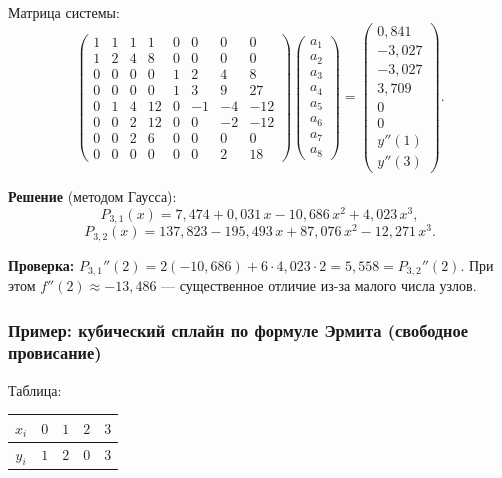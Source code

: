 Матрица системы:
\[
    \begin{pmatrix}
        1 & 1 & 1 & 1 & 0 & 0 & 0 & 0 \\
        1 & 2 & 4 & 8 & 0 & 0 & 0 & 0 \\
        0 & 0 & 0 & 0 & 1 & 2 & 4 & 8 \\
        0 & 0 & 0 & 0 & 1 & 3 & 9 & 27 \\
        0 & 1 & 4 & 12 & 0 & -1 & -4 & -12 \\
        0 & 0 & 2 & 12 & 0 & 0 & -2 & -12 \\
        0 & 0 & 2 & 6 & 0 & 0 & 0 & 0 \\
        0 & 0 & 0 & 0 & 0 & 0 & 2 & 18
    \end{pmatrix}
    \begin{pmatrix}
        a_1 \\ a_2 \\ a_3 \\ a_4 \\ a_5 \\ a_6 \\ a_7 \\ a_8
    \end{pmatrix}
    =
    \begin{pmatrix}
        0{,}841 \\ -3{,}027 \\ -3{,}027 \\ 3{,}709 \\ 0 \\ 0 \\ y''(1) \\ y''(3)
    \end{pmatrix}.
\]

\textbf{Решение} (методом Гаусса):
\[
    P_{3,1}(x) = 7{,}474 + 0{,}031\,x - 10{,}686\,x^2 + 4{,}023\,x^3,
\]
\[
    P_{3,2}(x) = 137{,}823 - 195{,}493\,x + 87{,}076\,x^2 - 12{,}271\,x^3.
\]

\textbf{Проверка:} $P_{3,1}''(2) = 2(-10{,}686) + 6 \cdot 4{,}023 \cdot 2 = 5{,}558 = P_{3,2}''(2)$\;\checkmark. При этом $f''(2) \approx -13{,}486$ --- существенное отличие из-за малого числа узлов.


\subsubsection*{Пример: кубический сплайн по формуле Эрмита (свободное провисание)}

Таблица:

\begin{center}
\begin{tabular}{c|cccc}
    $x_i$ & $0$ & $1$ & $2$ & $3$ \\
    \hline
    $y_i$ & $1$ & $2$ & $0$ & $3$
\end{tabular}
\end{center}

